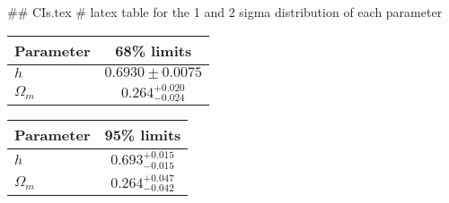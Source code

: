 ## CIs.tex
# latex table for the 1 and 2 sigma distribution of each parameter

\begin{tabular} { l  c}
 Parameter &  68\% limits\\
\hline
{\boldmath$h              $} & $0.6930\pm 0.0075          $\\
{\boldmath$\Omega_m       $} & $0.264^{+0.020}_{-0.024}   $\\
\hline
\end{tabular}

\begin{tabular} { l  c}
 Parameter &  95\% limits\\
\hline
{\boldmath$h              $} & $0.693^{+0.015}_{-0.015}   $\\
{\boldmath$\Omega_m       $} & $0.264^{+0.047}_{-0.042}   $\\
\hline
\end{tabular}
